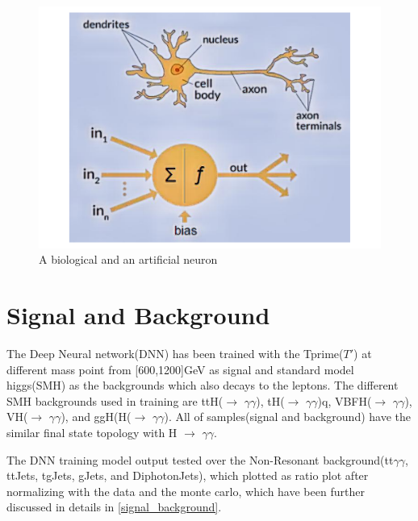 \begin{figure}[h]
    \centering
    \includegraphics[scale=0.4]{Figure/img_neuron.pdf}
    \caption{A biological and an artificial neuron}
    \label{fig:my_label_NN_ANNN}
\end{figure}

\section{Signal and Background}

The Deep Neural network(DNN) has been trained with the Tprime($T'$) at different mass point from [600,1200]GeV as signal and standard
model higgs(SMH) as the backgrounds which also decays to the leptons. The different SMH backgrounds used in training are
ttH($\longrightarrow$ $\gamma \gamma$), tH($\longrightarrow$ $\gamma \gamma$)q, VBFH($\longrightarrow$ $\gamma \gamma$),
VH($\longrightarrow$ $\gamma \gamma$), and ggH(H($\longrightarrow$ $\gamma \gamma$). All of samples(signal and background) have the
similar final state topology with H $\longrightarrow$ $\gamma \gamma$.

The DNN training model output tested over the Non-Resonant background(tt$\gamma \gamma$, ttJets, tgJets, gJets, and DiphotonJets), which plotted as ratio plot after normalizing with the data and the monte carlo, which have been further discussed in details in \autoref{signal_background}. 


